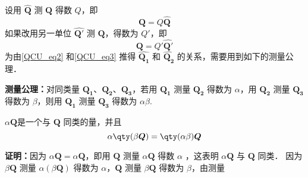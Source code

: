 设用 $\hat{\boldsymbol{Q}}$ 测 $\boldsymbol{Q}$ 得数 $Q$，即
\begin{equation}\label{QCU_eq2}
\boldsymbol{Q}=Q\hat{\boldsymbol{Q}}
\end{equation}
如果改用另一单位 $\hat{\boldsymbol{Q'}}$ 测 $\boldsymbol{Q}$，得数为 $Q'$，即
\begin{equation}\label{QCU_eq3}
\boldsymbol{Q}=Q'\hat{\boldsymbol{Q'}}
\end{equation}
为由\autoref{QCU_eq2} 和\autoref{QCU_eq3} 推得 $\hat{\boldsymbol{Q_1}}$ 和 $\hat{\boldsymbol{Q_2}}$ 的关系，需要用到如下的测量公理．

\textbf{测量公理：}对同类量 $\boldsymbol{Q_1}$、$\boldsymbol{Q_2}$、$\boldsymbol{Q_3}$，若用 $\boldsymbol{Q_1}$ 测量 $\boldsymbol{Q_2}$ 得数为 $\alpha$，用 $\boldsymbol{Q_2}$ 测量 $\boldsymbol{Q_3}$ 得数为 $\beta$，则用 $\boldsymbol{Q_1}$ 测量 $\boldsymbol{Q_3}$ 得数为 $\alpha\beta$.
\begin{theorem}{}
$\alpha \boldsymbol{Q}$是一个与 $\boldsymbol{Q}$ 同类的量，并且
\begin{equation}
\alpha\qty(\beta \boldsymbol{Q})=\qty(\alpha\beta)\boldsymbol Q
\end{equation}
\end{theorem}
\textbf{证明：}因为 $\alpha\boldsymbol{Q}=\alpha\boldsymbol{Q}$，即用 $\boldsymbol{Q}$ 测量 $\alpha\boldsymbol{Q}$ 得数 $\alpha$ ，这表明 $\alpha\boldsymbol{Q}$ 与 $\boldsymbol{Q}$ 同类．
因为 $\beta\boldsymbol{Q}$ 测量 $\alpha(\beta\boldsymbol{Q})$ 得数为 $\alpha$，$\boldsymbol{Q}$ 测量 $\beta\boldsymbol{Q}$ 得数为 $\beta$，由测量

